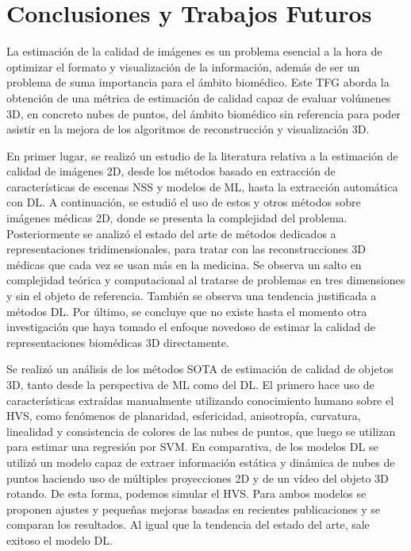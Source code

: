 \chapter{Conclusiones y Trabajos Futuros}
La estimación de la calidad de imágenes es un problema esencial a la hora 
de optimizar el formato y visualización de la información, además de ser 
un problema de suma importancia para el ámbito biomédico. Este TFG aborda 
la obtención de una métrica de estimación de calidad capaz de evaluar volúmenes 
3D, en concreto nubes de puntos, del ámbito biomédico sin referencia para poder asistir 
en la mejora de los algoritmos de reconstrucción y visualización 3D. 

En primer lugar, se realizó un estudio de la literatura relativa a la estimación de calidad 
de imágenes 2D, desde los métodos basado en extracción de características de escenas NSS y modelos de ML, hasta la extracción automática con DL. 
A continuación, se estudió el uso de estos y otros métodos sobre imágenes médicas 2D, donde se presenta la complejidad del problema. Posteriormente se analizó el estado del arte de métodos dedicados a representaciones tridimensionales, para tratar con las reconstrucciones 3D médicas que cada vez se usan más en la medicina. Se observa un salto en complejidad teórica y computacional al tratarse de problemas en tres dimensiones y sin el objeto de referencia. También se observa una tendencia justificada a métodos DL. 
 Por último, se concluye que no existe hasta el momento 
otra investigación que haya tomado el enfoque novedoso de estimar la calidad de 
representaciones biomédicas 3D directamente. 

Se realizó un análisis de los métodos SOTA de estimación de calidad de objetos 
3D, tanto desde la perspectiva de ML como del DL. El primero hace uso de características 
extraídas manualmente utilizando conocimiento humano sobre el HVS, como fenómenos 
de planaridad, esfericidad, anisotropía, curvatura, linealidad y consistencia de 
colores de las nubes de puntos, que luego se utilizan para estimar una regresión por 
SVM. En comparativa, de los modelos DL se utilizó un modelo capaz de extraer 
información estática y dinámica de nubes de puntos haciendo uso de múltiples 
proyecciones 2D y de un vídeo del objeto 3D rotando. De esta forma, podemos  
simular el HVS. Para ambos modelos se proponen ajustes y pequeñas mejoras basadas 
en recientes publicaciones y se comparan los resultados. 
Al igual que la tendencia del estado del arte, sale exitoso el modelo DL. 

